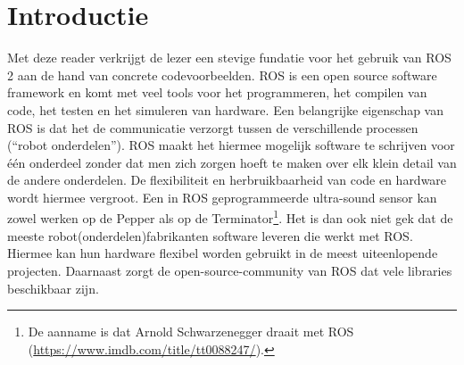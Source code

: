 \chapter{Introductie}

\noindent Met deze reader verkrijgt de lezer een stevige fundatie voor het gebruik van ROS 2 aan de hand van concrete codevoorbeelden. ROS is een open source software framework en komt met veel tools voor het programmeren, het compilen van code, het testen en het simuleren van hardware. Een belangrijke eigenschap van ROS is dat het de communicatie verzorgt tussen de verschillende processen (``robot onderdelen''). ROS maakt het hiermee mogelijk software te schrijven voor \'e\'en onderdeel zonder dat men zich zorgen hoeft te maken over elk klein detail van de andere onderdelen. De flexibiliteit en herbruikbaarheid van code en hardware wordt hiermee vergroot. Een in ROS geprogrammeerde ultra-sound sensor kan zowel werken op de Pepper als op de Terminator\footnote{De aanname is dat Arnold Schwarzenegger draait met ROS (\url{https://www.imdb.com/title/tt0088247/}).}. Het is dan ook niet gek dat de meeste robot(onderdelen)fabrikanten software leveren die werkt met ROS. Hiermee kan hun hardware flexibel worden gebruikt in de meest uiteenlopende projecten. Daarnaast zorgt de open-source-community van ROS dat vele libraries beschikbaar zijn.

